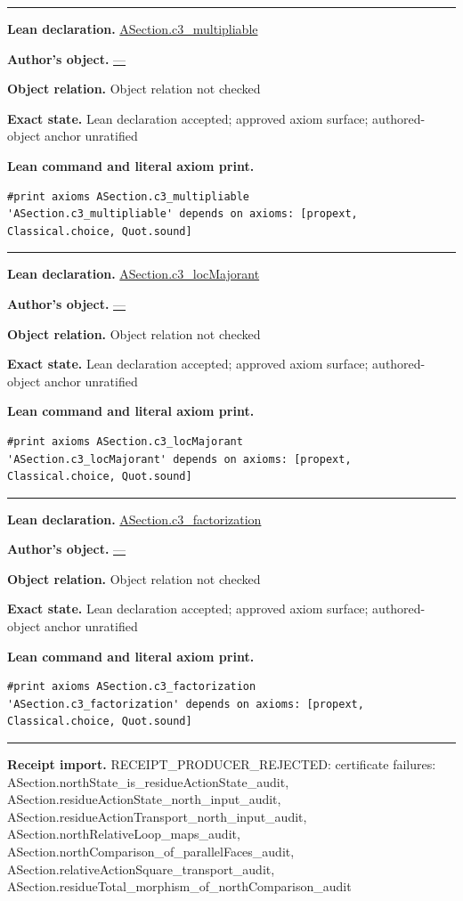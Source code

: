 \documentclass[11pt]{article}
\theoremstyle{plain}
\theoremstyle{definition}
\theoremstyle{remark}
\begin{document}
\begin{tcolorbox}
\begin{Verbatim}[breaklines=true,breakanywhere=true,fontsize=\small]
\end{Verbatim}
\medskip\hrule\medskip
\textbf{Lean declaration.} \url{ASection.c3_multipliable}
\par\textbf{Author's object.} \url{—}
\par\textbf{Object relation.} Object relation not checked
\par\textbf{Exact state.} Lean declaration accepted; approved axiom surface; authored-object anchor unratified
\par\smallskip\textbf{Lean command and literal axiom print.}
\begin{Verbatim}[breaklines=true,breakanywhere=true,fontsize=\small]
#print axioms ASection.c3_multipliable
'ASection.c3_multipliable' depends on axioms: [propext, Classical.choice, Quot.sound]
\end{Verbatim}
\medskip\hrule\medskip
\textbf{Lean declaration.} \url{ASection.c3_locMajorant}
\par\textbf{Author's object.} \url{—}
\par\textbf{Object relation.} Object relation not checked
\par\textbf{Exact state.} Lean declaration accepted; approved axiom surface; authored-object anchor unratified
\par\smallskip\textbf{Lean command and literal axiom print.}
\begin{Verbatim}[breaklines=true,breakanywhere=true,fontsize=\small]
#print axioms ASection.c3_locMajorant
'ASection.c3_locMajorant' depends on axioms: [propext, Classical.choice, Quot.sound]
\end{Verbatim}
\medskip\hrule\medskip
\textbf{Lean declaration.} \url{ASection.c3_factorization}
\par\textbf{Author's object.} \url{—}
\par\textbf{Object relation.} Object relation not checked
\par\textbf{Exact state.} Lean declaration accepted; approved axiom surface; authored-object anchor unratified
\par\smallskip\textbf{Lean command and literal axiom print.}
\begin{Verbatim}[breaklines=true,breakanywhere=true,fontsize=\small]
#print axioms ASection.c3_factorization
'ASection.c3_factorization' depends on axioms: [propext, Classical.choice, Quot.sound]
\end{Verbatim}
\medskip\hrule\medskip
\textbf{Receipt import.} \textcolor{KgtRed}{RECEIPT\_PRODUCER\_REJECTED: certificate failures: ASection.northState\_is\_residueActionState\_audit, ASection.residueActionState\_north\_input\_audit, ASection.residueActionTransport\_north\_input\_audit, ASection.northRelativeLoop\_maps\_audit, ASection.northComparison\_of\_parallelFaces\_audit, ASection.relativeActionSquare\_transport\_audit, ASection.residueTotal\_morphism\_of\_northComparison\_audit}
\end{tcolorbox}
\end{document}
